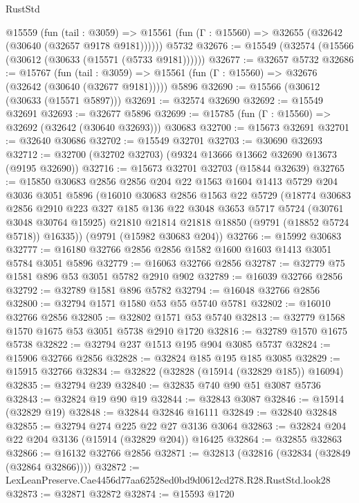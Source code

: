 \begin{lexlean}{RustStd}
\begin{coremodule}
    @15559
      (fun (tail : @3059) =>
      @15561 (fun (Γ : @15560) => @32655 (@32642 (@30640 (@32657 @9178 @9181))))))
    @5732
@32676 := @15549 (@32574 (@15566 (@30612 (@30633 (@15571 (@5733 @9181))))))
@32677 := @32657 @5732
@32686 := @15767
    (fun (tail : @3059) => @15561 (fun (Γ : @15560) => @32676 (@32642 (@30640 (@32677 @9181)))))
    @5896
@32690 := @15566 (@30612 (@30633 (@15571 @5897)))
@32691 := @32574 @32690
@32692 := @15549 @32691
@32693 := @32677 @5896
@32699 := @15785 (fun (Γ : @15560) => @32692 (@32642 (@30640 @32693))) @30683
@32700 := @15673 @32691
@32701 := @32640 @30686
@32702 := @15549 @32701
@32703 := @30690 @32693
@32712 := @32700 (@32702 @32703) (@9324 @13666 @13662 @32690 @13673 (@9195 @32690))
@32716 := @15673 @32701 @32703 (@15844 @32639)
@32765 := @15850
    @30683
    @2856
    @2856
    @204
    @22
    @1563
    @1604
    @1413
    @5729
    @204
    @3036
    @3051
    @5896
    (@16010
      @30683
      @2856
      @1563
      @22
      @5729
      (@18774
        @30683
        @2856
        @2910
        @223
        @327
        @185
        @136
        @22
        @3048
        @3653
        @5717
        @5724
        (@30761 @3048 @30764 @15925)
        @21810
        @21814
        @21818
        @18850
        (@9791 (@18852 @5724 @5718))
        @16335))
    (@9791 (@15982 @30683 @204))
@32766 := @15992 @30683
@32777 := @16180 @32766 @2856 @2856 @1582 @1600 @1603 @1413 @3051 @5784 @3051 @5896
@32779 := @16063 @32766 @2856
@32787 := @32779 @75 @1581 @896 @53 @3051 @5782 @2910 @902
@32789 := @16039 @32766 @2856
@32792 := @32789 @1581 @896 @5782
@32794 := @16048 @32766 @2856
@32800 := @32794 @1571 @1580 @53 @55 @5740 @5781
@32802 := @16010 @32766 @2856
@32805 := @32802 @1571 @53 @5740
@32813 := @32779 @1568 @1570 @1675 @53 @3051 @5738 @2910 @1720
@32816 := @32789 @1570 @1675 @5738
@32822 := @32794 @237 @1513 @195 @904 @3085 @5737
@32824 := @15906 @32766 @2856
@32828 := @32824 @185 @195 @185 @3085
@32829 := @15915 @32766
@32834 := @32822 (@32828 (@15914 (@32829 @185)) @16094)
@32835 := @32794 @239
@32840 := @32835 @740 @90 @51 @3087 @5736
@32843 := @32824 @19 @90 @19
@32844 := @32843 @3087
@32846 := @15914 (@32829 @19)
@32848 := @32844 @32846 @16111
@32849 := @32840 @32848
@32855 := @32794 @274 @225 @22 @27 @3136 @3064
@32863 := @32824 @204 @22 @204 @3136 (@15914 (@32829 @204)) @16425
@32864 := @32855 @32863
@32866 := @16132 @32766 @2856
@32871 := @32813 (@32816 (@32834 (@32849 (@32864 @32866))))
@32872 := LexLeanPreserve.Cae4456d77aa62528ed0bd9d0612cd278.R28.RustStd.look28
@32873 := @32871 @32872
@32874 := @15593 @1720

\end{coremodule}
\end{lexlean}
